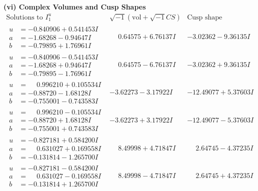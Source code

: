 \documentclass[1p]{elsarticle_modified}
\theoremstyle{definition}
\newcommand{\I}{\sqrt{-1}}
\begin{document}
\newpage\flushleft \textbf{(vi) Complex Volumes and Cusp Shapes}
$$\begin{array}{c|c|c}  
\text{Solutions to }I^u_{1}& \I (\text{vol} + \sqrt{-1}CS) & \text{Cusp shape}\\
 \hline 
\begin{aligned}
u &= -0.840906 + 0.541453 I \\
a &= -1.68268 - 0.94647 I \\
b &= -0.79895 + 1.76961 I\end{aligned}
 & \phantom{-}0.64575 + 6.76137 I & -3.02362 - 9.36135 I \\ \hline\begin{aligned}
u &= -0.840906 - 0.541453 I \\
a &= -1.68268 + 0.94647 I \\
b &= -0.79895 - 1.76961 I\end{aligned}
 & \phantom{-}0.64575 - 6.76137 I & -3.02362 + 9.36135 I \\ \hline\begin{aligned}
u &= \phantom{-}0.996210 + 0.105534 I \\
a &= -0.88720 - 1.68128 I \\
b &= -0.755001 - 0.743583 I\end{aligned}
 & -3.62273 - 3.17922 I & -12.49077 + 5.37603 I \\ \hline\begin{aligned}
u &= \phantom{-}0.996210 - 0.105534 I \\
a &= -0.88720 + 1.68128 I \\
b &= -0.755001 + 0.743583 I\end{aligned}
 & -3.62273 + 3.17922 I & -12.49077 - 5.37603 I \\ \hline\begin{aligned}
u &= -0.827181 + 0.584200 I \\
a &= \phantom{-}0.631027 + 0.169558 I \\
b &= -0.131814 - 1.265700 I\end{aligned}
 & \phantom{-}8.49998 + 4.71847 I & \phantom{-}2.64745 - 4.37235 I \\ \hline\begin{aligned}
u &= -0.827181 - 0.584200 I \\
a &= \phantom{-}0.631027 - 0.169558 I \\
b &= -0.131814 + 1.265700 I\end{aligned}
 & \phantom{-}8.49998 - 4.71847 I & \phantom{-}2.64745 + 4.37235 I \\ \hline\begin{aligned}

\end{aligned}
\end{array}$$
\end{document}
